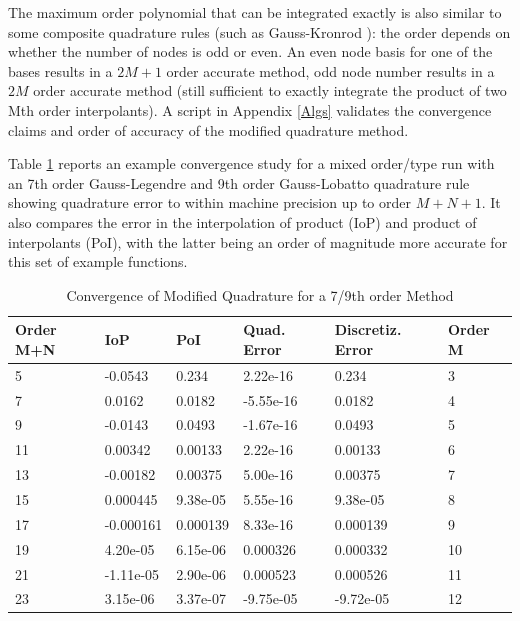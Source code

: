 \documentclass[letterpaper,12pt]{report}
\begin{document}
The maximum order polynomial that can be integrated exactly is also similar to some composite quadrature rules (such as Gauss-Kronrod \cite{Roni}): the order depends on whether the number of nodes is odd or even. An even node basis for one of the bases results in a $2M+1$ order accurate method, odd node number results in a $2M$ order accurate method (still sufficient to exactly integrate the product of two Mth order interpolants). A script in Appendix \ref{Algs} validates the convergence claims and order of accuracy of the modified quadrature method.

Table \ref{table:QuadMod} reports an example convergence study for a mixed order/type run with an 7th order Gauss-Legendre and 9th order Gauss-Lobatto quadrature rule showing quadrature error to within machine precision up to order $M+N+1$. It also compares the error in the interpolation of product (IoP) and product of interpolants (PoI), with the latter being an order of magnitude more accurate for this set of example functions.

\begin{table}
\centering
\caption{Convergence of Modified Quadrature for a 7/9th order Method}\label{table:QuadMod}
\begin{tabular}{llllll}
\hline
Order M+N & IoP       & PoI      & Quad. Error & Discretiz. Error &  Order M  \\ \hline
5         & -0.0543   & 0.234    & 2.22e-16         & 0.234                & 3  \\
7         & 0.0162    & 0.0182   & -5.55e-16        & 0.0182               & 4  \\
9         & -0.0143   & 0.0493   & -1.67e-16        & 0.0493               & 5  \\
11        & 0.00342   & 0.00133  & 2.22e-16         & 0.00133              & 6  \\
13        & -0.00182  & 0.00375  & 5.00e-16         & 0.00375              & 7  \\
15        & 0.000445  & 9.38e-05 & 5.55e-16         & 9.38e-05             & 8  \\
17        & -0.000161 & 0.000139 & 8.33e-16         & 0.000139             & 9  \\
19        & 4.20e-05  & 6.15e-06 & 0.000326         & 0.000332             & 10 \\
21        & -1.11e-05 & 2.90e-06 & 0.000523         & 0.000526             & 11 \\
23        & 3.15e-06  & 3.37e-07 & -9.75e-05        & -9.72e-05            & 12 \\ \hline
\end{tabular}
\end{table}
\end{document}
